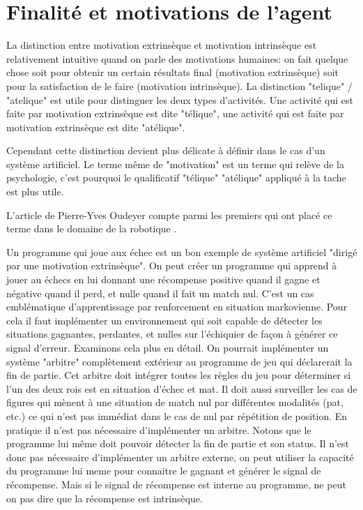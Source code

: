 \section{Finalité et motivations de l'agent}
\label{sec:motivation_intrinseque}

\noindent
La distinction entre motivation extrinsèque et motivation intrinsèque est relativement intuitive quand on parle des motivations humaines: on fait quelque chose soit pour obtenir un certain résultats final (motivation extrinsèque) soit pour la satisfaction de le faire (motivation intrinsèque).
La distinction "telique" / "atelique" est utile pour distinguer les deux types d'activités. 
Une activité qui est faite par motivation extrinsèque est dite "télique", une activité qui est faite par motivation extrinsèque est dite "atélique". 

Cependant cette distinction devient plus délicate à définir dans le cas d'un système artificiel.
Le terme même de "motivation" est un terme qui relève de la psychologie, c'est pourquoi le qualificatif "télique" "atélique" appliqué à la tache est plus utile. 

L'article de Pierre-Yves Oudeyer compte parmi les premiers qui ont placé ce terme dans le domaine de la robotique  \cite{oudeyer_intrinsic_2007}.
\og {} \fg \cite{oudeyer_what_2007} 

Un programme qui joue aux échec est un bon exemple de système artificiel "dirigé par une motivation extrinsèque". 
On peut créer un programme qui apprend à jouer au échecs en lui donnant une récompense positive quand il gagne et négative quand il perd, et nulle quand il fait un match nul. 
C'est un cas emblématique d'apprentissage par renforcement en situation markovienne.
Pour cela il faut implémenter un environnement qui soit capable de détecter les situations gagnantes, perdantes, et nulles sur l'échiquier de façon à générer ce signal d'erreur. 
Examinons cela plus en détail.
On pourrait implémenter un système "arbitre" complètement extérieur au programme de jeu qui déclarerait la fin de partie. 
Cet arbitre doit intégrer toutes les règles du jeu pour déterminer si l'un des deux rois est en situation d'échec et mat. 
Il doit aussi surveiller les cas de figures qui mènent à une situation de match nul par différentes modalités (pat, etc.) ce qui n'est pas immédiat dans le cas de nul par répétition de position. 
En pratique il n'est pas nécessaire d'implémenter un arbitre. 
Notons que le programme lui même doit pouvoir détecter la fin de partie et son status.
Il n'est donc pas nécessaire d'implémenter un arbitre externe, on peut utiliser la capacité du programme lui meme pour connaitre le gagnant et générer le signal de récompense. 
Mais si le signal de récompense est interne au programme, ne peut on pas dire que la récompense est intrinsèque. 


